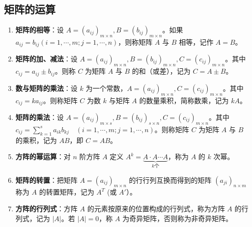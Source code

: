 \documentclass[UTF8]{ctexart}
\theoremstyle{mydef}
\begin{document}
\subsection{矩阵的运算}
\begin{enumerate}
    \item \textbf{矩阵的相等}：设 $A=(a_{ij})_{m \times n}, B=(b_{ij})_{m \times n}$。如果 $a_{ij} = b_{ij} (i=1, \cdots, m; j=1, \cdots, n)$，则称矩阵 $A$ 与 $B$ 相等，记作 $A=B$。
    \item \textbf{矩阵的加、减法}：设 $A=(a_{ij})_{m \times n}, B=(b_{ij})_{m \times n}, C=(c_{ij})_{m \times n}$。其中 $c_{ij} = a_{ij} \pm b_{ij}$。则称 $C$ 为矩阵 $A$ 与 $B$ 的和（或差），记为 $C = A \pm B$。
    \item \textbf{数与矩阵的乘法}：设 $k$ 为一个常数，$A=(a_{ij})_{m \times n}, C=(c_{ij})_{m \times n}$。其中 $c_{ij} = k a_{ij}$。则称矩阵 $C$ 为数 $k$ 与矩阵 $A$ 的数量乘积，简称数乘，记为 $kA$。
    \item \textbf{矩阵的乘法}：设 $A=(a_{ij})_{m \times s}, B=(b_{ij})_{s \times n}, C=(c_{ij})_{m \times n}$。其中 $c_{ij} = \sum_{k=1}^s a_{ik}b_{kj} \quad (i=1, \cdots, m; j=1, \cdots, n)$。则称矩阵 $C$ 为矩阵 $A$ 与 $B$ 的乘积，记为 $AB$，即 $C=AB$。
    \item \textbf{方阵的幂运算}：对 $n$ 阶方阵 $A$ 定义 $A^k = \underbrace{A \cdot A \cdots A}_{k \text{个}}$，称为 $A$ 的 $k$ 次幂。
    \item \textbf{矩阵的转置}：把矩阵 $A=(a_{ij})_{m \times n}$ 的行行列互换而得到的矩阵 $(a_{ji})_{n \times m}$ 称为 $A$ 的转置矩阵，记为 $A^T$ (或 $A'$）。
    \item \textbf{方阵的行列式}：方阵 $A$ 的元素按原来的位置构成的行列式，称为方阵 $A$ 的行列式，记为 $|A|$。若 $|A|=0$，称 $A$ 为奇异矩阵，否则称为非奇异矩阵。
\end{enumerate}
\end{document}
